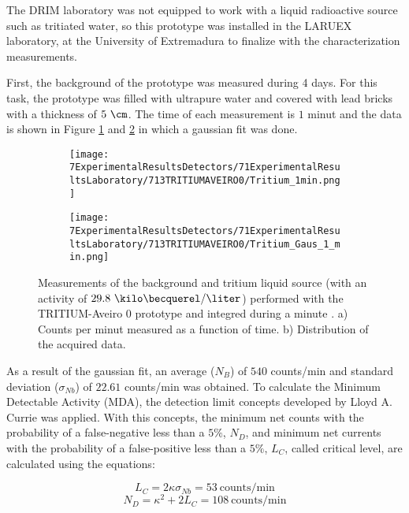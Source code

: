 The DRIM laboratory was not equipped to work with a liquid radioactive source such as tritiated water, so this prototype was installed in the LARUEX laboratory, at the University of Extremadura to finalize with the characterization measurements. 

First, the background of the prototype was measured during 4 days. For this task, the prototype was filled with ultrapure water and covered with lead bricks with a thickness of $5~\cm$. The time of each measurement is $1$ minut and the data is shown in Figure \ref{subfig:MeasurementInRealTime} and \ref{subfig:DistributionofMeasurement} in which a gaussian fit was done. 

\begin{figure}
\centering
    \begin{subfigure}[b]{0.45\textwidth}
    \centering
    \texttt{[image: 7ExperimentalResultsDetectors/71ExperimentalResultsLaboratory/713TRITIUMAVEIRO0/Tritium\_1min.png]}  
    \caption{\label{subfig:MeasurementInRealTime}}
    \end{subfigure}
    \hfill
    \begin{subfigure}[b]{0.45\textwidth}
    \centering
    \texttt{[image: 7ExperimentalResultsDetectors/71ExperimentalResultsLaboratory/713TRITIUMAVEIRO0/Tritium\_Gaus\_1\_min.png]}  
    \caption{\label{subfig:DistributionofMeasurement}}
    \end{subfigure}
 \caption{Measurements of the background and tritium liquid source (with an activity of $29.8~\kilo\becquerel/\liter$) performed with the TRITIUM-Aveiro 0 prototype and integred during a minute \cite{ExperimentalPaperCarlos}. a) Counts per minut measured as a function of time. b) Distribution of the acquired data.}
 \label{fig:BackgroundTritium1min}
\end{figure}

As a result of the gaussian fit, an average ($N_B$) of $540$ counts/min and standard deviation ($\sigma_{Nb}$) of $22.61$ counts/min was obtained. To calculate the Minimum Detectable Activity (MDA), the detection limit concepts developed by Lloyd A. Currie \cite{CurieLimit} was applied.  With this concepts, the minimum net counts with the probability of a false-negative less than a $5\%$, $N_D$, and minimum net currents with the probability of a false-positive less than a $5\%$, $L_C$, called critical level, are calculated using the equations:

\begin{equation}
L_C = 2\kappa\sigma_{Nb} =53 ~\text{counts/min}
\label{eq:EquationCriticalLimit}
\end{equation}
\begin{equation}
N_D = \kappa^2 + 2L_C = 108~\text{counts/min}
\label{eq:EquationNetCounts}
\end{equation}

